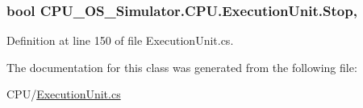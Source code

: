 \subsubsection[{Stop}]{\setlength{\rightskip}{0pt plus 5cm}bool C\+P\+U\+\_\+\+O\+S\+\_\+\+Simulator.\+C\+P\+U.\+Execution\+Unit.\+Stop\hspace{0.3cm}{\ttfamily [get]}, {\ttfamily [set]}}\label{class_c_p_u___o_s___simulator_1_1_c_p_u_1_1_execution_unit_a1b8748f1c6679263e5dc03fe382ad150}


Definition at line 150 of file Execution\+Unit.\+cs.



The documentation for this class was generated from the following file\+:\begin{DoxyCompactItemize}
\item 
C\+P\+U/\hyperlink{_execution_unit_8cs}{Execution\+Unit.\+cs}\end{DoxyCompactItemize}
